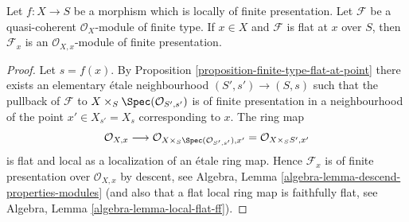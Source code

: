 \begin{lemma}
\label{lemma-finite-type-flat-at-point-local}
Let $f : X \to S$ be a morphism which is locally of finite presentation.
Let $\mathcal{F}$ be a quasi-coherent $\mathcal{O}_X$-module of finite type.
If $x \in X$ and $\mathcal{F}$ is flat at $x$ over $S$, then
$\mathcal{F}_x$ is an $\mathcal{O}_{X, x}$-module of finite presentation.
\end{lemma}

\begin{proof}
Let $s = f(x)$. By
Proposition \ref{proposition-finite-type-flat-at-point}
there exists an elementary \'etale neighbourhood $(S', s') \to (S, s)$
such that the pullback of $\mathcal{F}$ to
$X \times_S \Spec(\mathcal{O}_{S', s'})$ is of
finite presentation in a neighbourhood of the point $x' \in X_{s'} = X_s$
corresponding to $x$. The ring map
$$
\mathcal{O}_{X, x} \longrightarrow
\mathcal{O}_{X \times_S \Spec(\mathcal{O}_{S', s'}), x'}
=
\mathcal{O}_{X \times_S S', x'}
$$
is flat and local as a localization of an \'etale ring map. Hence
$\mathcal{F}_x$ is of finite presentation over $\mathcal{O}_{X, x}$
by descent, see
Algebra, Lemma \ref{algebra-lemma-descend-properties-modules}
(and also that a flat local ring map is faithfully flat, see
Algebra, Lemma \ref{algebra-lemma-local-flat-ff}).
\end{proof}
